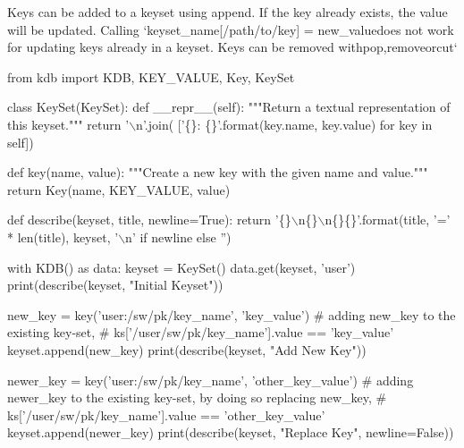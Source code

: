 Keys can be added to a keyset using {\ttfamily append}. If the key already exists, the value will be updated. Calling `keyset\+\_\+name\mbox{[}\textquotesingle{}/path/to/key\textquotesingle{}\mbox{]} = \textquotesingle{}new\+\_\+value{\ttfamily does not work for updating keys already in a keyset. Keys can be removed with}pop{\ttfamily ,}remove{\ttfamily or}cut`


\begin{DoxyCode}
\textcolor{keyword}{from} kdb \textcolor{keyword}{import} KDB, KEY\_VALUE, Key, KeySet


\textcolor{keyword}{class }KeySet(KeySet):
    \textcolor{keyword}{def }\_\_repr\_\_(self):
        \textcolor{stringliteral}{"""Return a textual representation of this keyset."""}
        \textcolor{keywordflow}{return} \textcolor{stringliteral}{'\(\backslash\)n'}.join(
            [\textcolor{stringliteral}{'\{\}: \{\}'}.format(key.name, key.value) \textcolor{keywordflow}{for} key \textcolor{keywordflow}{in} self])


\textcolor{keyword}{def }key(name, value):
    \textcolor{stringliteral}{"""Create a new key with the given name and value."""}
    \textcolor{keywordflow}{return} Key(name, KEY\_VALUE, value)


\textcolor{keyword}{def }describe(keyset, title, newline=True):
    \textcolor{keywordflow}{return} \textcolor{stringliteral}{'\{\}\(\backslash\)n\{\}\(\backslash\)n\{\}\{\}'}.format(title, \textcolor{stringliteral}{'='} * len(title), keyset,
                                 \textcolor{stringliteral}{'\(\backslash\)n'} \textcolor{keywordflow}{if} newline \textcolor{keywordflow}{else} \textcolor{stringliteral}{''})


with KDB() \textcolor{keyword}{as} data:
    keyset = KeySet()
    data.get(keyset, \textcolor{stringliteral}{'user'})
    print(describe(keyset, \textcolor{stringliteral}{"Initial Keyset"}))

    new\_key = key(\textcolor{stringliteral}{'user:/sw/pk/key\_name'}, \textcolor{stringliteral}{'key\_value'})
    \textcolor{comment}{# adding new\_key to the existing key-set,}
    \textcolor{comment}{# ks['/user/sw/pk/key\_name'].value == 'key\_value'}
    keyset.append(new\_key)
    print(describe(keyset, \textcolor{stringliteral}{"Add New Key"}))

    newer\_key = key(\textcolor{stringliteral}{'user:/sw/pk/key\_name'}, \textcolor{stringliteral}{'other\_key\_value'})
    \textcolor{comment}{# adding newer\_key to the existing key-set, by doing so replacing new\_key,}
    \textcolor{comment}{# ks['/user/sw/pk/key\_name'].value == 'other\_key\_value'}
    keyset.append(newer\_key)
    print(describe(keyset, \textcolor{stringliteral}{"Replace Key"}, newline=\textcolor{keyword}{False}))
\end{DoxyCode}
 